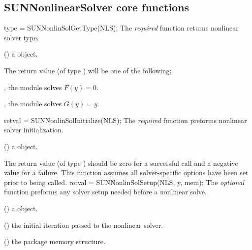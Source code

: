 \subsection{SUNNonlinearSolver core functions}
\label{ss:sunnonlinsol_corefn}
{
  type = SUNNonlinSolGetType(NLS);
}
{
  The \textit{required} function  returns
  nonlinear solver type.
}
{
  \begin{args}[NLS]
  \item[NLS] ()
    a {\sunnonlinsol} object.
  \end{args}
}
{
  The return value  (of type ) will be one of the
  following:
  \begin{args}
  \item[\Id{SUNNONLINEARSOLVER\_ROOTFIND}]
    , the {\sunnonlinsol} module solves $F(y) = 0$.
  \item[\Id{SUNNONLINEARSOLVER\_STATIONARY}]
    , the {\sunnonlinsol} module solves $G(y) = y$.
  \end{args}
}
{}
{
  retval = SUNNonlinSolInitialize(NLS);
}
{
  The \textit{required} function  preforms
  nonlinear solver initialization.
}
{
  \begin{args}[NLS]
  \item[NLS] ()
    a {\sunnonlinsol} object.
  \end{args}
}
{
  The return value  (of type ) should be zero for a
  successful call and a negative value for a failure.
}
{
  This function assumes all solver-specific options have been set prior
  to being called.
}
{
  retval = SUNNonlinSolSetup(NLS, y, mem);
}
{
  The \textit{optional} function  preforms any
  solver setup needed before a nonlinear solve.
}
{
  \begin{args}[NLS]
  \item[NLS] ()
    a {\sunnonlinsol} object.
  \item[y] ()
    the initial iteration passed to the nonlinear solver.
  \item[mem] ()
    the {\sundials} package memory structure.
  \end{args}
}
